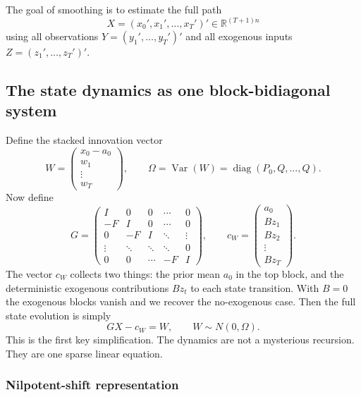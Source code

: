 \documentclass[11pt]{article}
\newcommand{\Var}{\operatorname{Var}}
\newcommand{\diag}{\operatorname{diag}}
\begin{document}
The goal of smoothing is to estimate the full path
\begin{equation}
X=(x_0',x_1',\ldots,x_T')'\in\mathbb R^{(T+1)n}
\end{equation}
using all observations $Y=(y_1',\ldots,y_T')'$ and all exogenous inputs
$Z=(z_1',\ldots,z_T')'$.

\subsection{The state dynamics as one block-bidiagonal system}

Define the stacked innovation vector
\begin{equation}
W=\begin{pmatrix}x_0-a_0\\ w_1\\ \vdots\\ w_T\end{pmatrix},
\qquad
\Omega=\Var(W)=\diag(P_0,Q,\ldots,Q).
\end{equation}
Now define
\begin{equation}
G=\begin{pmatrix}
I & 0 & 0 & \cdots & 0\\
-F & I & 0 & \cdots & 0\\
0 & -F & I & \ddots & \vdots\\
\vdots & \ddots & \ddots & \ddots & 0\\
0 & 0 & \cdots & -F & I
\end{pmatrix},
\qquad
c_W=\begin{pmatrix}a_0\\ Bz_1\\ Bz_2\\ \vdots\\ Bz_T\end{pmatrix}.
\end{equation}
The vector $c_W$ collects two things: the prior mean $a_0$ in the
top block, and the deterministic exogenous contributions $Bz_t$ to
each state transition.  With $B=0$ the exogenous blocks vanish and we
recover the no-exogenous case.
Then the full state evolution is simply
\begin{equation}
GX-c_W=W,\qquad W\sim N(0,\Omega).
\label{eq:dyn}
\end{equation}
This is the first key simplification.  The dynamics are not a mysterious
recursion.  They are one sparse linear equation.

\subsubsection{Nilpotent-shift representation}
\end{document}
